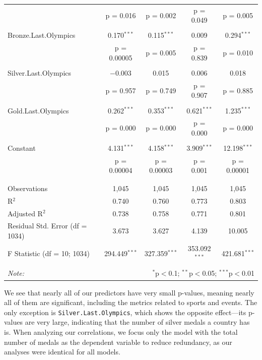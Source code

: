 \documentclass{mcmthesis}
\begin{document}
\begin{longtable}{@{\extracolsep{5pt}}lcccc}
  & p = 0.016 & p = 0.002 & p = 0.049 & p = 0.005 \\ 
  & & & & \\ 
 Bronze.Last.Olympics & 0.170$^{***}$ & 0.115$^{***}$ & 0.009 & 0.294$^{***}$ \\ 
  & p = 0.00005 & p = 0.005 & p = 0.839 & p = 0.010 \\ 
  & & & & \\ 
 Silver.Last.Olympics & $-$0.003 & 0.015 & 0.006 & 0.018 \\ 
  & p = 0.957 & p = 0.749 & p = 0.907 & p = 0.885 \\ 
  & & & & \\ 
 Gold.Last.Olympics & 0.262$^{***}$ & 0.353$^{***}$ & 0.621$^{***}$ & 1.235$^{***}$ \\ 
  & p = 0.000 & p = 0.000 & p = 0.000 & p = 0.000 \\ 
  & & & & \\ 
 Constant & 4.131$^{***}$ & 4.158$^{***}$ & 3.909$^{***}$ & 12.198$^{***}$ \\ 
  & p = 0.00004 & p = 0.00003 & p = 0.001 & p = 0.00001 \\ 
  & & & & \\ 
\hline \\[-1.8ex] 
Observations & 1,045 & 1,045 & 1,045 & 1,045 \\ 
R$^{2}$ & 0.740 & 0.760 & 0.773 & 0.803 \\ 
Adjusted R$^{2}$ & 0.738 & 0.758 & 0.771 & 0.801 \\ 
Residual Std. Error (df = 1034) & 3.673 & 3.627 & 4.139 & 10.005 \\ 
F Statistic (df = 10; 1034) & 294.449$^{***}$ & 327.359$^{***}$ & 353.092$^{***}$ & 421.681$^{***}$ \\ 
\hline 
\hline \\[-1.8ex] 
\textit{Note:}  & \multicolumn{4}{r}{$^{*}$p$<$0.1; $^{**}$p$<$0.05; $^{***}$p$<$0.01} \\ 
\end{longtable} 

We see that nearly all of our predictors have very small p-values, meaning nearly all of them are significant, including the metrics related to sports and events. The only exception is \texttt{Silver.Last.Olympics}, which shows the opposite effect---its p-values are very large, indicating that the number of silver medals a country has is. When analyzing our correlations, we focus only the model with the total number of medals as the dependent variable to reduce redundancy, as our analyses were identical for all models. 
\end{document}
